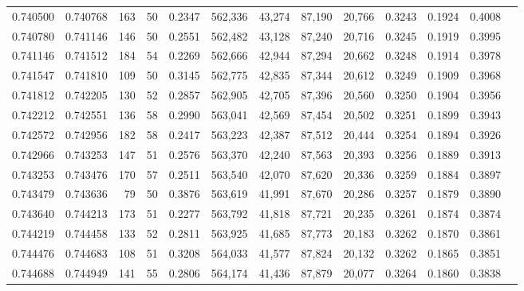 \begin{tabular}{rrrrrrrrrrrrr}
0.740500 & 0.740768 &   163 &  50 &                                     0.2347 & 562,336 &  43,274 &  87,190 &  20,766 & 0.3243 & 0.1924 & 0.4008 \\
0.740780 & 0.741146 &   146 &  50 &                                     0.2551 & 562,482 &  43,128 &  87,240 &  20,716 & 0.3245 & 0.1919 & 0.3995 \\
0.741146 & 0.741512 &   184 &  54 &                                     0.2269 & 562,666 &  42,944 &  87,294 &  20,662 & 0.3248 & 0.1914 & 0.3978 \\
0.741547 & 0.741810 &   109 &  50 &                                     0.3145 & 562,775 &  42,835 &  87,344 &  20,612 & 0.3249 & 0.1909 & 0.3968 \\
0.741812 & 0.742205 &   130 &  52 &                                     0.2857 & 562,905 &  42,705 &  87,396 &  20,560 & 0.3250 & 0.1904 & 0.3956 \\
0.742212 & 0.742551 &   136 &  58 &                                     0.2990 & 563,041 &  42,569 &  87,454 &  20,502 & 0.3251 & 0.1899 & 0.3943 \\
0.742572 & 0.742956 &   182 &  58 &                                     0.2417 & 563,223 &  42,387 &  87,512 &  20,444 & 0.3254 & 0.1894 & 0.3926 \\
0.742966 & 0.743253 &   147 &  51 &                                     0.2576 & 563,370 &  42,240 &  87,563 &  20,393 & 0.3256 & 0.1889 & 0.3913 \\
0.743253 & 0.743476 &   170 &  57 &                                     0.2511 & 563,540 &  42,070 &  87,620 &  20,336 & 0.3259 & 0.1884 & 0.3897 \\
0.743479 & 0.743636 &    79 &  50 &                                     0.3876 & 563,619 &  41,991 &  87,670 &  20,286 & 0.3257 & 0.1879 & 0.3890 \\
0.743640 & 0.744213 &   173 &  51 &                                     0.2277 & 563,792 &  41,818 &  87,721 &  20,235 & 0.3261 & 0.1874 & 0.3874 \\
0.744219 & 0.744458 &   133 &  52 &                                     0.2811 & 563,925 &  41,685 &  87,773 &  20,183 & 0.3262 & 0.1870 & 0.3861 \\
0.744476 & 0.744683 &   108 &  51 &                                     0.3208 & 564,033 &  41,577 &  87,824 &  20,132 & 0.3262 & 0.1865 & 0.3851 \\
0.744688 & 0.744949 &   141 &  55 &                                     0.2806 & 564,174 &  41,436 &  87,879 &  20,077 & 0.3264 & 0.1860 & 0.3838 \\

\end{tabular}
